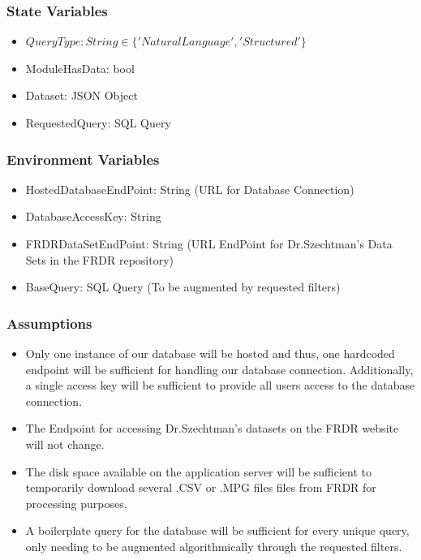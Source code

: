 \documentclass[12pt, titlepage]{article}
\begin{document}
\subsubsection{State Variables}

\begin{itemize}
  \item{$QueryType: String \in \{'NaturalLanguage','Structured'\}$}
  \item{ModuleHasData: bool}
  \item{Dataset: JSON Object}
  \item{RequestedQuery: SQL Query}


\end{itemize}

\subsubsection{Environment Variables}

  \begin{itemize}
    \item{HostedDatabaseEndPoint: String (URL for Database Connection)}
    \item{DatabaseAccessKey: String}
    \item{FRDRDataSetEndPoint: String (URL EndPoint for Dr.Szechtman's Data Sets in the FRDR repository)}
    \item{BaseQuery: SQL Query (To be augmented by requested filters)}
  \end{itemize}

\subsubsection{Assumptions}

\begin{itemize}
  \item{Only one instance of our database will be hosted and thus, one hardcoded endpoint will be sufficient for handling our database connection. Additionally,
  a single access key will be sufficient to provide all users access to the database connection.}
  \item{The Endpoint for accessing Dr.Szechtman's datasets on the FRDR website will not change.}
  \item{The disk space available on the application server will be sufficient to temporarily download several .CSV or .MPG files files from FRDR for
  processing purposes.}
  \item{A boilerplate query for the database will be sufficient for every unique query, only needing to be augmented algorithmically through the requested
  filters.}
\end{itemize}
\end{document}
